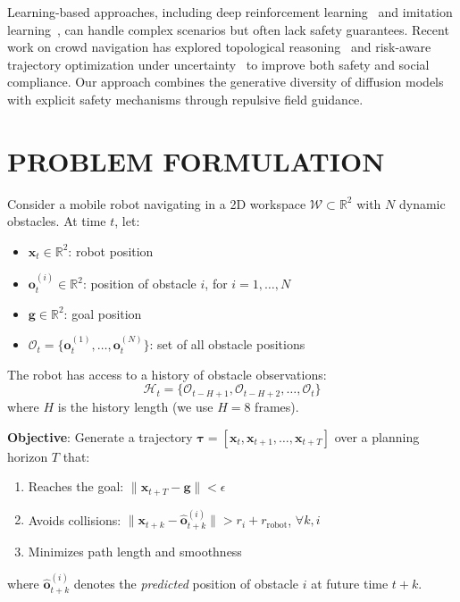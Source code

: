 \documentclass[letterpaper, 10 pt, conference]{ieeeconf}
\begin{document}
Learning-based approaches, including deep reinforcement learning~\cite{chen2017socially, everett2018motion, samsani2021socially, ourari2022nearest} and imitation learning~\cite{tai2018socially}, can handle complex scenarios but often lack safety guarantees. Recent work on crowd navigation has explored topological reasoning~\cite{mavrogiannis2023winding} and risk-aware trajectory optimization under uncertainty~\cite{lew2023risk} to improve both safety and social compliance. Our approach combines the generative diversity of diffusion models with explicit safety mechanisms through repulsive field guidance.

\section{PROBLEM FORMULATION}

Consider a mobile robot navigating in a 2D workspace $\mathcal{W} \subset \mathbb{R}^2$ with $N$ dynamic obstacles. At time $t$, let:
\begin{itemize}
    \item $\mathbf{x}_t \in \mathbb{R}^2$: robot position
    \item $\mathbf{o}_t^{(i)} \in \mathbb{R}^2$: position of obstacle $i$, for $i = 1, \ldots, N$
    \item $\mathbf{g} \in \mathbb{R}^2$: goal position
    \item $\mathcal{O}_t = \{\mathbf{o}_t^{(1)}, \ldots, \mathbf{o}_t^{(N)}\}$: set of all obstacle positions
\end{itemize}

The robot has access to a history of obstacle observations:
\begin{equation}
    \mathcal{H}_t = \{\mathcal{O}_{t-H+1}, \mathcal{O}_{t-H+2}, \ldots, \mathcal{O}_t\}
\end{equation}
where $H$ is the history length (we use $H=8$ frames).

\textbf{Objective}: Generate a trajectory $\boldsymbol{\tau} = [\mathbf{x}_t, \mathbf{x}_{t+1}, \ldots, \mathbf{x}_{t+T}]$ over a planning horizon $T$ that:
\begin{enumerate}
    \item Reaches the goal: $\|\mathbf{x}_{t+T} - \mathbf{g}\| < \epsilon$
    \item Avoids collisions: $\|\mathbf{x}_{t+k} - \hat{\mathbf{o}}_{t+k}^{(i)}\| > r_i + r_{\text{robot}}$, $\forall k, i$
    \item Minimizes path length and smoothness
\end{enumerate}
where $\hat{\mathbf{o}}_{t+k}^{(i)}$ denotes the \textit{predicted} position of obstacle $i$ at future time $t+k$.
\end{document}
